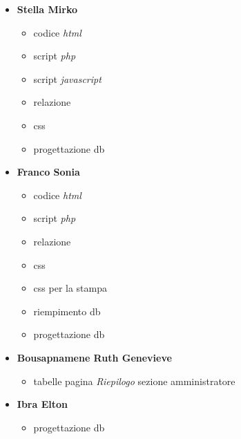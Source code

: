 \documentclass[a4paper]{article}
\begin{document}
\begin{itemize}
    \item [] \textbf{Stella Mirko}
    \begin{itemize}
        \item codice \textit{html}
        \item script \textit{php}
        \item script \textit{javascript}
        \item relazione
        \item css
        \item progettazione db
    \end{itemize}
    \item [] \textbf{Franco Sonia}
    \begin{itemize}
        \item codice \textit{html}
        \item script \textit{php}
        \item relazione
        \item css
        \item css per la stampa
        \item riempimento db
        \item progettazione db
    \end{itemize}
    \item [] \textbf{Bousapnamene Ruth Genevieve}
    \begin{itemize}
        \item tabelle pagina \textit{Riepilogo} sezione amministratore
    \end{itemize}
    \item [] \textbf{Ibra Elton}
    \begin{itemize}
        \item progettazione db
    \end{itemize}
\end{itemize}
\end{document}

